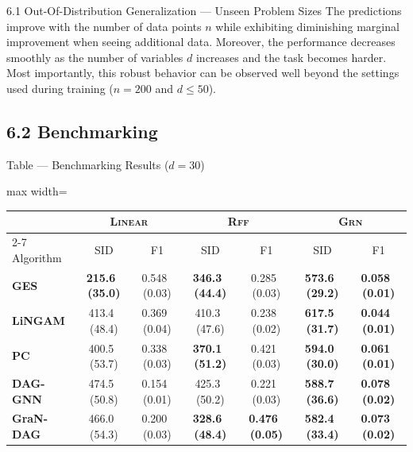 \documentclass[aspectratio=169,10pt]{beamer}
\newcommand{\err}[1]{\tiny{$\,$(#1)}}
\newcommand{\highlight}[1]{\textbf{#1}}
\newcommand{\domain}[1]{\textsc{#1}}
\newcommand{\ges}{\textbf{GES}}
\newcommand{\pc}{\textbf{PC}}
\newcommand{\lingam}{\textbf{LiNGAM}}
\newcommand{\daggnn}{\textbf{DAG-GNN}}
\newcommand{\grandag}{\textbf{GraN-DAG}}
\begin{document}
\begin{frame}{6.1 Out-Of-Distribution Generalization --- Unseen Problem Sizes}
The predictions improve with the number of data points $n$ while exhibiting diminishing marginal improvement when seeing additional data. Moreover, the performance decreases smoothly as the number of variables $d$ increases and the task becomes harder. Most importantly, this robust behavior can be observed well beyond the settings used during training ($n=200$ and $d \leq 50$).
\end{frame}

\subsection{6.2 Benchmarking}

\begin{frame}{Table --- Benchmarking Results ($d=30$)}
\small
\begin{adjustbox}{max width=\textwidth}
\begin{tabular}{lcccccc}
\toprule
 &           \multicolumn{2}{c}{\domain{Linear}}            &            \multicolumn{2}{c}{\domain{Rff}}           &        \multicolumn{2}{c}{\domain{Grn}}       \\
\cmidrule{2-7}
Algorithm &              SID &               F1  &              SID &               F1 &              SID &               F1\\
\midrule
\ges               &  \highlight{215.6 \err{35.0}} &              0.548 \err{0.03} &  \highlight{346.3 \err{44.4}} &              0.285 \err{0.03}  &  \highlight{573.6 \err{29.2}} &  \highlight{0.058 \err{0.01}} \\
\lingam            &              413.4 \err{48.4} &              0.369 \err{0.04} &              410.3 \err{47.6} &              0.238 \err{0.02}  &  \highlight{617.5 \err{31.7}} &  \highlight{0.044 \err{0.01}} \\
\pc                &              400.5 \err{53.7} &              0.338 \err{0.03} &  \highlight{370.1 \err{51.2}} &              0.421 \err{0.03}  &  \highlight{594.0 \err{30.0}} &  \highlight{0.061 \err{0.01}} \\
\daggnn            &              474.5 \err{50.8} &              0.154 \err{0.01} &              425.3 \err{50.2} &              0.221 \err{0.03}  &  \highlight{588.7 \err{36.6}} &  \highlight{0.078 \err{0.02}} \\
\grandag           &              466.0 \err{54.3} &              0.200 \err{0.03} & \highlight{328.6 \err{48.4}} &  \highlight{0.476 \err{0.05}} & \highlight{582.4 \err{33.4}} & \highlight{0.073 \err{0.02}}\\

\end{tabular}
\end{adjustbox}
\end{frame}
\end{document}
